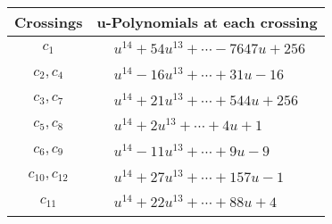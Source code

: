 \documentclass[1p]{elsarticle_modified}
\theoremstyle{definition}
\begin{document}
\begin{tabular}{m{50pt}|m{274pt}}
Crossings & \hspace{64pt}u-Polynomials at each crossing \\
\hline $$\begin{aligned}c_{1}\end{aligned}$$&$\begin{aligned}
&u^{14}+54 u^{13}+\cdots-7647 u+256
\end{aligned}$\\
\hline $$\begin{aligned}c_{2},c_{4}\end{aligned}$$&$\begin{aligned}
&u^{14}-16 u^{13}+\cdots+31 u-16
\end{aligned}$\\
\hline $$\begin{aligned}c_{3},c_{7}\end{aligned}$$&$\begin{aligned}
&u^{14}+21 u^{13}+\cdots+544 u+256
\end{aligned}$\\
\hline $$\begin{aligned}c_{5},c_{8}\end{aligned}$$&$\begin{aligned}
&u^{14}+2 u^{13}+\cdots+4 u+1
\end{aligned}$\\
\hline $$\begin{aligned}c_{6},c_{9}\end{aligned}$$&$\begin{aligned}
&u^{14}-11 u^{13}+\cdots+9 u-9
\end{aligned}$\\
\hline $$\begin{aligned}c_{10},c_{12}\end{aligned}$$&$\begin{aligned}
&u^{14}+27 u^{13}+\cdots+157 u-1
\end{aligned}$\\
\hline $$\begin{aligned}c_{11}\end{aligned}$$&$\begin{aligned}
&u^{14}+22 u^{13}+\cdots+88 u+4
\end{aligned}$\\
\hline
\end{tabular}\\~\\
\newpage\renewcommand{\arraystretch}{1}
\end{document}
